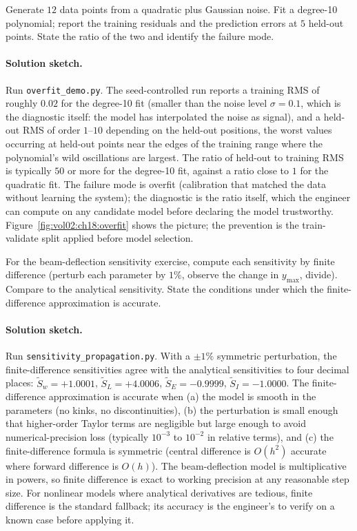 \begin{exercise}
Generate $12$ data points from a quadratic plus Gaussian noise.
Fit a degree-10 polynomial; report the training residuals and
the prediction errors at $5$ held-out points. State the ratio
of the two and identify the failure mode.

\paragraph{Solution sketch.} Run \texttt{overfit\_demo.py}. The
seed-controlled run reports a training RMS of roughly $0.02$ for
the degree-10 fit (smaller than the noise level $\sigma = 0.1$,
which is the diagnostic itself: the model has interpolated the
noise as signal), and a held-out RMS of order $1$--$10$
depending on the held-out positions, the worst values occurring
at held-out points near the edges of the training range where the
polynomial's wild oscillations are largest. The ratio of held-out
to training RMS is typically $50$ or more for the degree-10 fit,
against a ratio close to $1$ for the quadratic fit. The failure
mode is overfit (calibration that matched the data without
learning the system); the diagnostic is the ratio itself, which
the engineer can compute on any candidate model before declaring
the model trustworthy. Figure~\ref{fig:vol02:ch18:overfit} shows
the picture; the prevention is the train-validate split applied
before model selection.
\end{exercise}

\begin{exercise}
For the beam-deflection sensitivity exercise, compute each
sensitivity by finite difference (perturb each parameter by
$1\%$, observe the change in $y_{\max}$, divide). Compare to
the analytical sensitivity. State the conditions under which
the finite-difference approximation is accurate.

\paragraph{Solution sketch.} Run \texttt{sensitivity\_propagation.py}.
With a $\pm 1\%$ symmetric perturbation, the finite-difference
sensitivities agree with the analytical sensitivities to four
decimal places: $\tilde S_{w} = +1.0001$, $\tilde S_{L} =
+4.0006$, $\tilde S_{E} = -0.9999$, $\tilde S_{I} = -1.0000$.
The finite-difference approximation is accurate when (a) the model
is smooth in the parameters (no kinks, no discontinuities), (b)
the perturbation is small enough that higher-order Taylor terms
are negligible but large enough to avoid numerical-precision loss
(typically $10^{-3}$ to $10^{-2}$ in relative terms), and (c) the
finite-difference formula is symmetric (central difference is
$O(h^{2})$ accurate where forward difference is $O(h)$). The
beam-deflection model is multiplicative in powers, so finite
difference is exact to working precision at any reasonable step
size. For
nonlinear models where analytical derivatives are tedious, finite
difference is the standard fallback; its accuracy is the engineer's
to verify on a known case before applying it.
\end{exercise}

